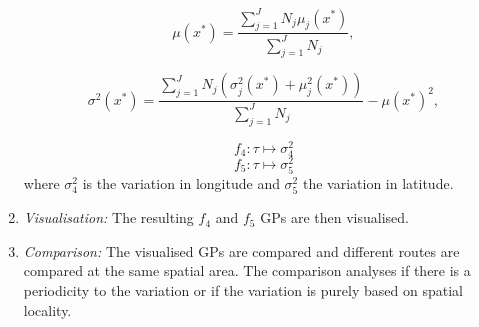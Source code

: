 \begin{enumerate}
    \begin{equation} \label{eq:mean-point-wise-combined}
        \mu(x^*) = \frac{\sum_{j=1}^{J} N_j\mu_j(x^*)}{\sum_{j=1}^{J} N_j},
    \end{equation}

    \begin{equation} \label{eq:var-point-wise-combined}
        \sigma^2(x^*) = \frac{\sum_{j=1}^{J} N_j(\sigma_j^2(x^*) + \mu_j^2(x^*))}{\sum_{j=1}^{J} N_j} - \mu(x^*)^2,
    \end{equation}

    \begin{equation} \label{eq:gps-var-f4}
        f_4: \tau \longmapsto \sigma_4^2
    \end{equation}
    \begin{equation} \label{eq:gps-var-f5}
        f_5: \tau \longmapsto \sigma_5^2
    \end{equation}
    where $\sigma_4^2$ is the variation in longitude and $\sigma_5^2$ the variation in latitude.

    \item \textit{Visualisation:}
    The resulting $f_4$ and $f_5$ GPs are then visualised. 

    \item \textit{Comparison:}
    The visualised GPs are compared and different routes are compared at the same spatial area.
    The comparison analyses if there is a periodicity to the variation or if the variation is purely based on spatial locality.
\end{enumerate} 